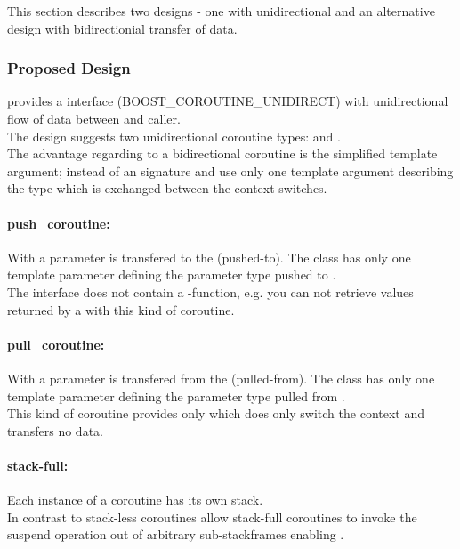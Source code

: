 This section describes two designs - one with unidirectional and an alternative
design with bidirectionial transfer of data.\\

\subsubsection*{Proposed Design}
\boostcoroutine provides a interface (BOOST\_COROUTINE\_UNIDIRECT) with
unidirectional flow of data between \corofunction and caller.\\
The design suggests two unidirectional coroutine types: \pushcoro and
\pullcoro.\\
The advantage regarding to a bidirectional coroutine is the simplified template
argument; instead of an signature \pullcoro and \pushcoro use only one template
argument describing the type which is exchanged between the context switches.

\paragraph*{push\_coroutine:}
With \pushcoro a parameter is transfered to the \corofunction (pushed-to). The
class has only one template parameter defining the parameter type pushed to
\corofunction.\\
\newline
The interface does not contain a -function, e.g. you can not retrieve
values returned by a \corofunction with this kind of coroutine.

\paragraph*{pull\_coroutine:}
With \pullcoro a parameter is transfered from the \corofunction (pulled-from). The
class has only one template parameter defining the parameter type pulled from
\corofunction.\\
\newline
This kind of coroutine provides only \pullcoroop which does only switch the
context and transfers no data.

\paragraph*{stack-full:}
Each instance of a coroutine has its own stack.\\
\newline
In contrast to stack-less coroutines allow stack-full coroutines to invoke the
suspend operation out of arbitrary sub-stackframes enabling \escreops.

